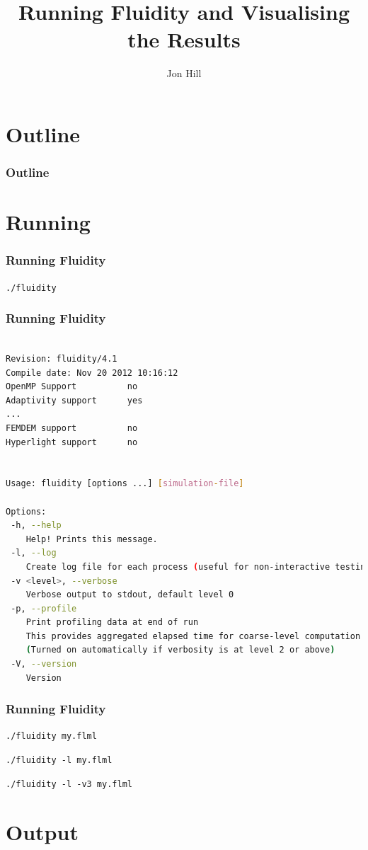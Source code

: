 \documentclass[12pt]{beamer}
\title[Running]{Running Fluidity and Visualising the Results}
\subtitle[]{}
\institute{1 - Dept of Earth Science and Engineering, Imperial College London}
\author[Jon Hill]{\large{Jon Hill}\inst{1}}
\date{}
\begin{document}
\begin{frame}
  \titlepage
\end{frame}

\section*{Outline}
\begin{frame}
  \frametitle{Outline}
  \tableofcontents
\end{frame}

\section{Running}
\begin{frame}
    \frametitle{Running Fluidity}

    \texttt{./fluidity}

\end{frame}
\begin{frame}[fragile]
    \frametitle{Running Fluidity}
\lstset{language=bash,basicstyle=\tiny}
\begin{lstlisting}[language=bash]

Revision: fluidity/4.1
Compile date: Nov 20 2012 10:16:12
OpenMP Support			no
Adaptivity support		yes
...
FEMDEM support			no
Hyperlight support		no


Usage: fluidity [options ...] [simulation-file]

Options:
 -h, --help
	Help! Prints this message.
 -l, --log
	Create log file for each process (useful for non-interactive testing).
 -v <level>, --verbose
	Verbose output to stdout, default level 0
 -p, --profile
	Print profiling data at end of run
	This provides aggregated elapsed time for coarse-level computation
	(Turned on automatically if verbosity is at level 2 or above)
 -V, --version
	Version
\end{lstlisting}
\end{frame}

\begin{frame}
    \frametitle{Running Fluidity}

\texttt{./fluidity my.flml}

\texttt{./fluidity -l my.flml}

\texttt{./fluidity -l -v3 my.flml}
\end{frame}


\section{Output}
\end{document}
